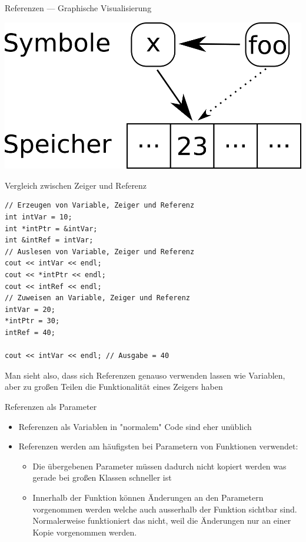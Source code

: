 \documentclass[presentation]{beamer}
\begin{document}
\begin{frame}[label={sec:orgc02fed9}]{Referenzen --- Graphische Visualisierung}
\begin{center}\begin{center}
\includegraphics[width=.9\linewidth]{img/references.png}
\end{center}\end{center}
\end{frame}
\begin{frame}[fragile,label={sec:orgd178f42}]{Vergleich zwischen Zeiger und Referenz}
 \begin{verbatim}
// Erzeugen von Variable, Zeiger und Referenz
int intVar = 10;
int *intPtr = &intVar;
int &intRef = intVar;
// Auslesen von Variable, Zeiger und Referenz
cout << intVar << endl;
cout << *intPtr << endl;
cout << intRef << endl;
// Zuweisen an Variable, Zeiger und Referenz
intVar = 20;
*intPtr = 30;
intRef = 40;

cout << intVar << endl; // Ausgabe = 40
\end{verbatim}

Man sieht also, dass sich Referenzen genauso verwenden lassen wie
Variablen, aber zu großen Teilen die Funktionalität eines Zeigers
haben
\end{frame}
\begin{frame}[label={sec:org7f33c2f}]{Referenzen als Parameter}
\begin{itemize}
\item Referenzen als Variablen in "normalem" Code sind eher unüblich
\item Referenzen werden am häufigsten bei Parametern von Funktionen
verwendet:
\begin{itemize}
\item Die übergebenen Parameter müssen dadurch nicht kopiert werden was
gerade bei großen Klassen schneller ist
\item Innerhalb der Funktion können Änderungen an den Parametern
vorgenommen werden welche auch ausserhalb der Funktion sichtbar
sind. Normalerweise funktioniert das nicht, weil die Änderungen
nur an einer Kopie vorgenommen werden.
\end{itemize}
\end{itemize}
\end{frame}
\end{document}
